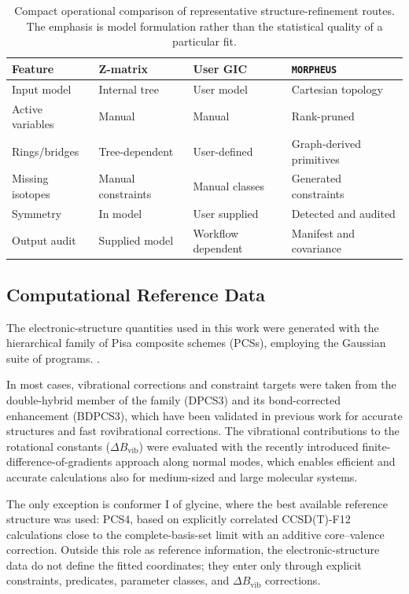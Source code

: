 \documentclass[aip,jcp,reprint,longbibliography,floatfix]{revtex4-2}
\begin{document}
\begin{table}
\caption{Compact operational comparison of representative
structure-refinement routes. The emphasis is model formulation rather than the
statistical quality of a particular fit.}
\label{tab:workflow-comparison}
\scriptsize
\setlength{\tabcolsep}{4pt}
\begin{tabular}{@{}llll@{}}
\toprule
Feature & Z-matrix & User GIC & \texttt{MORPHEUS} \\
\midrule
Input model & Internal tree & User model & Cartesian topology \\
Active variables & Manual & Manual & Rank-pruned \\
Rings/bridges & Tree-dependent & User-defined & Graph-derived primitives \\
Missing isotopes & Manual constraints & Manual classes & Generated constraints \\
Symmetry & In model & User supplied & Detected and audited \\
Output audit & Supplied model & Workflow dependent & Manifest and covariance \\
\bottomrule
\end{tabular}
\end{table}


\subsection{Computational Reference Data}

The electronic-structure quantities used in this work were generated with the
hierarchical family of Pisa composite schemes (PCSs),\cite{pcs1234_2024,Lazzari2025LCB25} employing the Gaussian suite of programs.
\cite{g16}.

In most cases, vibrational corrections and constraint targets were taken from the
double-hybrid member of the family (DPCS3) and its bond-corrected enhancement (BDPCS3),
which have been validated in previous work for accurate structures and fast rovibrational corrections.\cite{wires_2025,Mendolicchio2025FastDvib,acr_2026}
The vibrational contributions to the rotational constants
($\Delta B_\mathrm{vib}$) were evaluated with the recently introduced
finite-difference-of-gradients approach along normal modes, which enables
efficient and accurate calculations also for medium-sized and large molecular
systems.\cite{Mendolicchio2025FastDvib}

The only exception is conformer I of glycine, where the best available reference structure was used: PCS4, based on explicitly correlated CCSD(T)-F12 calculations close to the complete-basis-set limit with an additive core--valence correction. Outside this role as reference information, the electronic-structure
data do not define the fitted coordinates; they enter only through explicit
constraints, predicates, parameter classes, and $\Delta B_\mathrm{vib}$
corrections.
\end{document}
